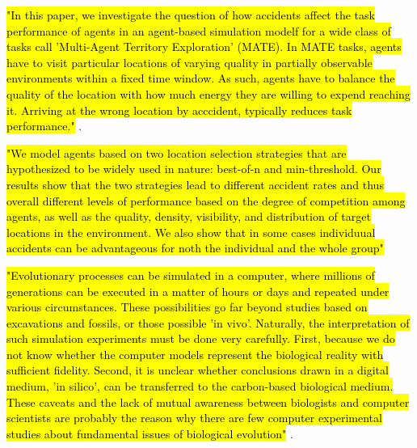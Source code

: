 \hl{"In this paper, we investigate the question of how accidents affect the task performance of agents in an agent-based simulation modelf for a wide class of tasks call 'Multi-Agent Territory Exploration' (MATE). In MATE tasks, agents have to visit particular locations of varying quality in partially observable environments within a fixed time window. As such, agents have to balance the quality of the location with how much energy they are willing to expend reaching it. Arriving at the wrong location by acccident, typically reduces task performance."} \cite{ferreira2018accidental}.

\hl{"We model agents based on two location selection strategies that are hypothesized to be widely used in nature: best-of-n and min-threshold. Our results show that the two strategies lead to different accident rates and thus overall different levels of performance based on the degree of competition among agents, as well as the quality, density, visibility, and distribution of target locations in the environment. We also show that in some cases individuual accidents can  be advantageous for noth the individual and the whole group"} \cite{ferreira2018accidental}



\hl{"Evolutionary processes can be simulated in a computer, where millions of generations can be executed in a matter of hours or days and repeated under various circumstances. These possibilities go far beyond studies based on excavations and fossils, or those possible 'in vivo'. Naturally, the interpretation of such simulation experiments must be done very carefully. First, because we do not know whether the computer models represent the biological reality with sufficient fidelity. Second, it is unclear whether conclusions drawn in a digital medium, 'in silico', can be transferred to the carbon-based biological medium. These caveats and the lack of mutual awareness between biologists and computer scientists are probably the reason why there are few computer experimental studies about fundamental issues of biological evolution"} \cite{EibenSmith2003}.




